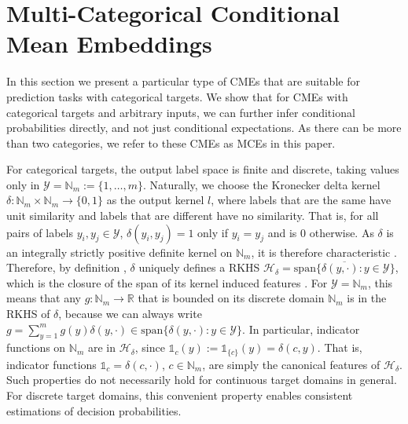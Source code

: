 \documentclass[twoside]{article}
\begin{document}
	\section{Multi-Categorical Conditional Mean Embeddings}
	\label{sec:multiclass_conditional_embedding}
		
		In this section we present a particular type of \glspl{CME} that are suitable for prediction tasks with categorical targets. We show that for \glspl{CME} with categorical targets and arbitrary inputs, we can further infer conditional probabilities directly, and not just conditional expectations. As there can be more than two categories, we refer to these \glspl{CME} as \glspl{MCE} in this paper.

		For categorical targets, the output label space is finite and discrete, taking values only in $\mathcal{Y} = \mathbb{N}_{m} := \{1, \dots, m\}$. Naturally, we choose the Kronecker delta kernel $\delta : \mathbb{N}_{m} \times \mathbb{N}_{m} \to \{0, 1\}$ as the output kernel $l$, where labels that are the same have unit similarity and labels that are different have no similarity. That is, for all pairs of labels $y_{i}, y_{j} \in \mathcal{Y}$, $\delta(y_{i}, y_{j}) = 1$ only if $y_{i} = y_{j}$ and is $0$ otherwise. As $\delta$ is an integrally strictly positive definite kernel on $\mathbb{N}_{m}$, it is therefore characteristic \citep[Theorem 7]{sriperumbudur2010hilbert}. Therefore, by definition \citep{fukumizu2004dimensionality}, $\delta$ uniquely defines a \gls{RKHS}  $\mathcal{H}_{\delta} = \overline{\mathrm{span}\{\delta(y, \cdot) : y \in \mathcal{Y}\}}$, which is the closure of the span of its kernel induced features \citep{xu2009refinement}. For $\mathcal{Y} = \mathbb{N}_{m}$, this means that any $g : \mathbb{N}_{m} \to \mathbb{R}$ that is bounded on its discrete domain $\mathbb{N}_{m}$ is in the \gls{RKHS} of $\delta$, because we can always write $g = \sum_{y = 1}^{m} g(y) \delta(y, \cdot) \in \mathrm{span}\{\delta(y, \cdot) : y \in \mathcal{Y}\}$. In particular, indicator functions on $\mathbb{N}_{m}$ are in $\mathcal{H}_{\delta}$, since $\mathbb{1}_{c}(y) := \mathbb{1}_{\{c\}}(y) = \delta(c, y)$.
		That is, indicator functions $\mathbb{1}_{c} = \delta(c, \cdot)$, $c \in \mathbb{N}_{m}$, are simply the canonical features of $\mathcal{H}_{\delta}$. Such properties do not necessarily hold for continuous target domains in general. For discrete target domains, this convenient property enables consistent estimations of decision probabilities.
		
\end{document}
